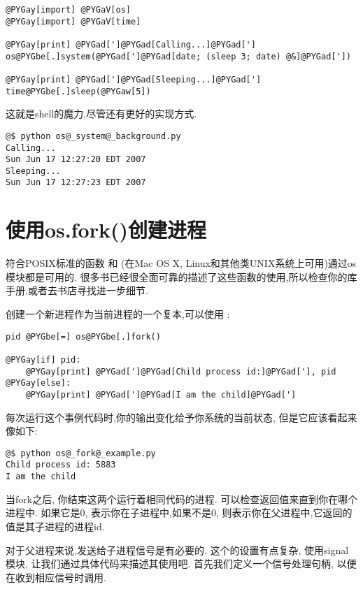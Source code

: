 \documentclass[a4paper,10pt,english]{manual}
\begin{document}
\begin{Verbatim}[commandchars=@\[\]]
@PYGay[import] @PYGaV[os]
@PYGay[import] @PYGaV[time]

@PYGay[print] @PYGad[']@PYGad[Calling...]@PYGad[']
os@PYGbe[.]system(@PYGad[']@PYGad[date; (sleep 3; date) @&]@PYGad['])

@PYGay[print] @PYGad[']@PYGad[Sleeping...]@PYGad[']
time@PYGbe[.]sleep(@PYGaw[5])
\end{Verbatim}

这就是shell的魔力,尽管还有更好的实现方式.

\begin{Verbatim}[commandchars=@\[\]]
@$ python os@_system@_background.py
Calling...
Sun Jun 17 12:27:20 EDT 2007
Sleeping...
Sun Jun 17 12:27:23 EDT 2007
\end{Verbatim}


\section{使用os.fork()创建进程}

符合POSIX标准的函数  和  (在Mac OS X, Linux和其他类UNIX系统上可用)通过os模块都是可用的. 很多书已经很全面可靠的描述了这些函数的使用,所以检查你的库手册,或者去书店寻找进一步细节.

创建一个新进程作为当前进程的一个复本,可以使用  :

\begin{Verbatim}[commandchars=@\[\]]
pid @PYGbe[=] os@PYGbe[.]fork()

@PYGay[if] pid:
    @PYGay[print] @PYGad[']@PYGad[Child process id:]@PYGad['], pid
@PYGay[else]:
    @PYGay[print] @PYGad[']@PYGad[I am the child]@PYGad[']
\end{Verbatim}

每次运行这个事例代码时,你的输出变化给予你系统的当前状态, 但是它应该看起来像如下:

\begin{Verbatim}[commandchars=@\[\]]
@$ python os@_fork@_example.py
Child process id: 5883
I am the child
\end{Verbatim}

当fork之后, 你结束这两个运行着相同代码的进程. 可以检查返回值来直到你在哪个进程中. 如果它是0, 表示你在子进程中,如果不是0, 则表示你在父进程中,它返回的值是其子进程的进程id.

对于父进程来说,发送给子进程信号是有必要的. 这个的设置有点复杂, 使用signal模块, 让我们通过具体代码来描述其使用吧. 首先我们定义一个信号处理句柄, 以便在收到相应信号时调用.
\end{document}
